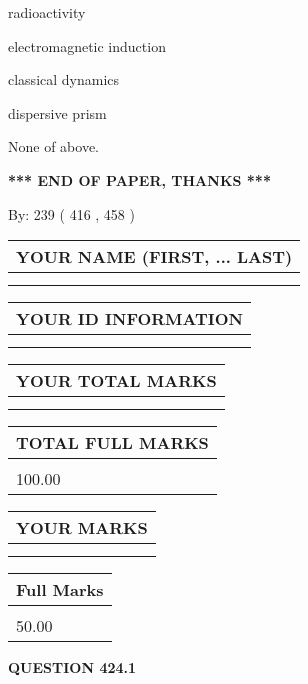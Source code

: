 \documentclass[12pt]{article}
\begin{document}
 
radioactivity
 
 
electromagnetic induction
 
 
classical dynamics
 
 
dispersive prism
 
 
 None of above.
 
 
   
   
\vspace{1.0in} 
{\textbf{\large{ *** END OF PAPER, THANKS *** }}} 
   
   
\hspace{1.0in} By: 
 239 ( 416 ,  458 )
   
   
   
   
\newpage 
\setcounter{page}{ 
   424001 } 
   
   
   
   
\noindent\begin{tabular}{|l|}
\hline
YOUR NAME (FIRST, ... LAST)  \\
\hline
 \\ 
 \\ 
\hline
\end{tabular}
\hspace{0.05in} \begin{tabular}{|l|}
\hline
 YOUR   ID   INFORMATION  \\
\hline
 \\ 
 \\ 
\hline
\end{tabular}
   
   
\vspace{0.2in}\noindent\begin{tabular}{|l|}
\hline
YOUR TOTAL MARKS  \\
\hline
 \\ 
 \\ 
\hline
\end{tabular}
\hspace{0.05in} \begin{tabular}{|l|}
\hline
TOTAL FULL MARKS  \\
\hline
 \\ 
100.00 \\
\hline
\end{tabular}
  
\vspace{0.2in}
  
\noindent\begin{tabular}{|l|}
\hline
 YOUR MARKS  \\
\hline
 \\ 
 \\ 
\hline
\end{tabular}
\hspace{0.05in} \begin{tabular}{|l|}
\hline
 Full Marks  \\
\hline
 \\ 
50.00 \\
\hline
\end{tabular}
{\textbf{\Large{QUESTION
424.1 
}}}
  
\end{document}
